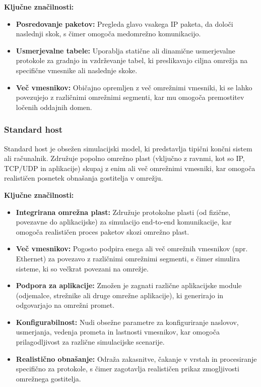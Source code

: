 \vspace{1em}
\noindent\begin{minipage}{\linewidth}
    \textbf{Ključne značilnosti:}
    \begin{itemize}
        \item \textbf{Posredovanje paketov:} Pregleda glavo vsakega IP paketa, da določi naslednji skok, s čimer omogoča medomrežno komunikacijo.
        \item \textbf{Usmerjevalne tabele:} Uporablja statične ali dinamične usmerjevalne protokole za gradnjo in vzdrževanje tabel, ki preslikavajo ciljna omrežja na specifične vmesnike ali naslednje skoke.
        \item \textbf{Več vmesnikov:} Običajno opremljen z več omrežnimi vmesniki, ki se lahko povezujejo z različnimi omrežnimi segmenti, kar mu omogoča premostitev ločenih oddajnih domen.
    \end{itemize}
\end{minipage}

\subsubsection{Standard host}
Standard host je obsežen simulacijski model, ki predstavlja tipični končni sistem ali računalnik. Združuje popolno omrežno plast (vključno z ravnmi, kot so IP, TCP/UDP in aplikacije) skupaj z enim ali več omrežnimi vmesniki, kar omogoča realističen posnetek obnašanja gostitelja v omrežju.

\vspace{1em}

\noindent\begin{minipage}{\linewidth}
    \textbf{Ključne značilnosti:}
    \begin{itemize}
        \item \textbf{Integrirana omrežna plast:} Združuje protokolne plasti (od fizične, povezavne do aplikacijske) za simulacijo end-to-end komunikacije, kar omogoča realističen proces paketov skozi omrežno plast.
        \item \textbf{Več vmesnikov:} Pogosto podpira enega ali več omrežnih vmesnikov (npr. Ethernet) za povezavo z različnimi omrežnimi segmenti, s čimer simulira sisteme, ki so večkrat povezani na omrežje.
        \item \textbf{Podpora za aplikacije:} Zmožen je zagnati različne aplikacijske module (odjemalce, strežnike ali druge omrežne aplikacije), ki generirajo in odgovarjajo na omrežni promet.
        \item \textbf{Konfigurabilnost:} Nudi obsežne parametre za konfiguriranje naslovov, usmerjanja, vedenja prometa in lastnosti vmesnikov, kar omogoča prilagodljivost za različne simulacijske scenarije.
        \item \textbf{Realistično obnašanje:} Odraža zakasnitve, čakanje v vrstah in procesiranje specifično za protokole, s čimer zagotavlja realističen prikaz zmogljivosti omrežnega gostitelja.
    \end{itemize}
\end{minipage}

